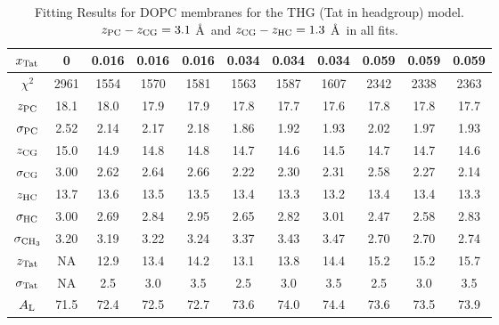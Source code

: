 \begin{table}[htbp]
  \centering
  \begin{tabular}{ccccccccccc}
    \hline
    $x_\textrm{Tat}$ & 0 & 0.016 & 0.016 & 0.016 & 0.034 & 0.034 & 0.034 & 0.059 & 0.059 & 0.059 \\
    \hline
    $\chi^2$ & 2961 & 1554 & 1570 & 1581 & 1563 & 1587 & 1607 & 2342 & 2338 & 2363 \\ 
    $z_\textrm{PC}$ & 18.1 & 18.0 & 17.9 & 17.9 & 17.8 & 17.7 & 17.6 & 17.8 & 17.8 & 17.7 \\
    $\sigma_\textrm{PC}$ & 2.52 & 2.14 & 2.17 & 2.18 & 1.86 & 1.92 & 1.93 & 2.02 & 1.97 & 1.93 \\
    $z_\textrm{CG}$ & 15.0 & 14.9 & 14.8 & 14.8 & 14.7 & 14.6 & 14.5 & 14.7 & 14.7 & 14.6 \\
    $\sigma_\textrm{CG}$ & 3.00 & 2.62 & 2.64 & 2.66 & 2.22 & 2.30 & 2.31 & 2.58 & 2.27 & 2.14 \\
    $z_\textrm{HC}$ & 13.7 & 13.6 & 13.5 & 13.5 & 13.4 & 13.3 & 13.2 & 13.4 & 13.4 & 13.3 \\ 
    $\sigma_\textrm{HC}$ & 3.00 & 2.69 & 2.84 & 2.95 & 2.65 & 2.82 & 3.01 & 2.47 & 2.58 & 2.83 \\
    $\sigma_{\textrm{CH}_3}$ & 3.20 & 3.19 & 3.22 & 3.24 & 3.37 & 3.43 & 3.47 & 2.70 & 2.70 & 2.74 \\
    $z_\textrm{Tat}$ & NA & 12.9 & 13.4 & 14.2 & 13.1 & 13.8 & 14.4 & 15.2 & 15.2 & 15.7 \\
    $\sigma_\textrm{Tat}$ & NA & 2.5 & 3.0 & 3.5 & 2.5 & 3.0 & 3.5 & 2.5 & 3.0 & 3.5 \\ 
    $A_\textrm{L}$ & 71.5 & 72.4 & 72.5 & 72.7 & 73.6 & 74.0 & 74.4 & 73.6 & 73.5 & 73.9 \\
    \hline
  \end{tabular}
  \caption{Fitting Results for DOPC membranes for the THG (Tat in headgroup) model. $z_\textrm{PC}-z_\textrm{CG} = 3.1$ \AA\
  and $z_\textrm{CG}-z_\textrm{HC} = 1.3$ \AA\ in all fits.}
  \label{tb:DOPC_fit_results}
\end{table}

